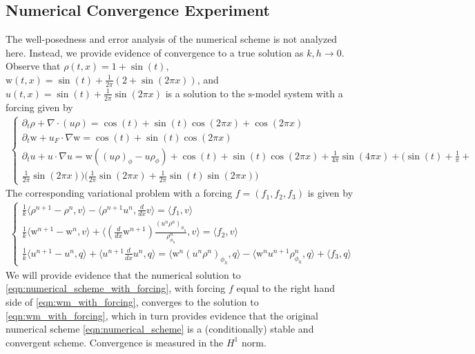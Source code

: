 \documentclass[11pt,letterpaper]{amsart}
\theoremstyle{plain}
\theoremstyle{definition}
\theoremstyle{remark}
\def \lan {\langle}
\def \ran {\rangle}
\def \st {\mathrm{s}}
\def \wt {\mathrm{w}}
\begin{document}
        \subsection{Numerical Convergence Experiment}
        \label{appdx:convg_experiment}
        The well-posedness and error analysis of the numerical scheme is not analyzed here.  
        Instead, we provide evidence of convergence to a true solution as $k, h \to 0$.  
        Observe that $\rho(t,x) = 1 + \sin(t)$, $\wt(t,x) = \sin(t) + \frac{1}{2\pi} (2 + \sin(2\pi x))$, 
        and $u(t,x) = \sin(t) + \frac{1}{2\pi} \sin(2\pi x)$ is a solution to the $\st$-model system with a forcing given by 
        \begin{align}
            \label{eqn:wm_with_forcing}
            \begin{cases}
                \partial_t \rho + \nabla \cdot (u\rho) = \cos(t) + \sin(t) \cos(2 \pi x) + \cos(2 \pi x) \\
                \partial_t \wt + u_F \cdot \nabla \wt = \cos(t) + \sin(t) \cos(2 \pi x) \\
                \partial_t u + u \cdot \nabla u  = \wt ((u \rho)_{\phi} - u \rho_{\phi}) + 
                \cos(t)  +  \sin(t) \cos(2 \pi x)  +  \frac{1}{4 \pi} \sin(4 \pi x)   +   \big( \sin(t)  +  \frac{1}{\pi}  +  
                \\\frac{1}{2  \pi} \sin(2 \pi x) \big)  \big( \frac{1}{2 \pi}  \sin(2 \pi x) + \frac{1}{2 \pi}  \sin(t)  \sin(2 \pi x) \big) 
            \end{cases}
        \end{align}    
        The corresponding variational problem with a forcing $f = (f_1, f_2, f_3)$ is given by 
        \begin{align}
            \label{eqn:numerical_scheme_with_forcing}
            \begin{cases}
                \frac{1}{k}  \lan \rho^{n+1} - \rho^n, v \ran     -   \lan \rho^{n+1} u^n, \frac{d}{dx} v \ran    =   \lan f_1, v \ran   \\ 
                \frac{1}{k}  \lan \wt^{n+1} - \wt^n, v \ran   +  \lan (\frac{d}{dx} \wt^{n+1}) \frac{(u^n \rho^n)_{\phi_h}}{\rho^n_{\phi_h}}, v  \ran     =   \lan f_2, v \ran  \\ 
                \frac{1}{k}  \lan u^{n+1} - u^n, q \ran   +  \lan u^{n+1} \frac{d}{dx} u^n, q \ran   =   \lan \wt^n (u^n \rho^n)_{\phi_h}, q \ran -  \lan \wt^n u^{n+1} \rho^n_{\phi_h}, q \ran + \lan f_3, q \ran
            \end{cases}
        \end{align}    
        We will provide evidence that the numerical solution to \eqref{eqn:numerical_scheme_with_forcing}, with forcing $f$ equal to the right hand side of \eqref{eqn:wm_with_forcing}, 
        converges to the solution to \eqref{eqn:wm_with_forcing}, which in turn provides evidence that the original numerical scheme \eqref{eqn:numerical_scheme} is a 
        (conditionally) stable and convergent scheme.  Convergence is measured in the $H^1$ norm.  
\end{document}
